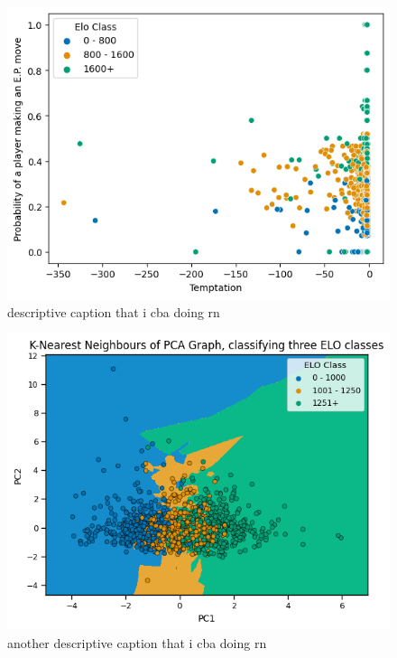 \documentclass[10pt,a4paper,twocolumn]{article}
\begin{document}
\begin{figure}[t]
  \centering
  \includegraphics{report/images/temptation_chart.png}
  \caption{descriptive caption that i cba doing rn}
  \label{fds-project-template:fig:temptation}
\end{figure}

\begin{figure}[t]
  \centering
  \includegraphics{report/images/knn_graph.png}
  \caption{another descriptive caption that i cba doing rn}
  \label{fds-project-template:fig:knn}
\end{figure}

\end{document}
